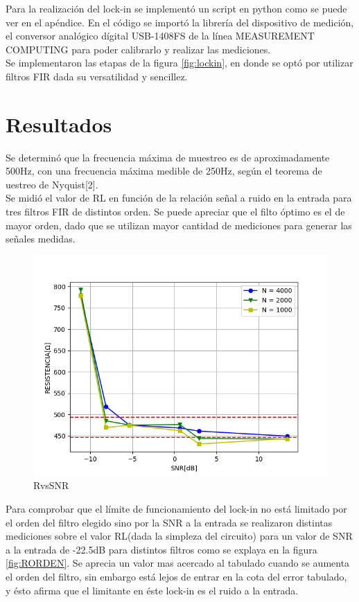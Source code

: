\documentclass[11pt,a4paper]{extarticle}
\begin{document}
\begin{multicols}{2}
Para la realización del lock-in se implementó un 
script en python como se puede ver en el apéndice.
En el código se importó la librería del dispositivo 
de medición, el 
conversor analógico dígital USB-1408FS de la línea 
MEASUREMENT COMPUTING para poder 
calibrarlo y realizar las mediciones.\\

Se implementaron 
las etapas de la figura \ref{fig:lockin}, en donde 
se optó por utilizar filtros FIR dada su versatilidad 
y sencillez.

\section{Resultados}

Se determinó que la frecuencia máxima de muestreo es 
de aproximadamente 
500Hz, con una frecuencia máxima medible de 250Hz, 
según el teorema de uestreo de Nyquist[2].\\

Se midió el valor de RL en función 
de la relación señal a ruido en la entrada para tres 
filtros FIR de distintos orden.
Se puede apreciar que el filto óptimo es el de mayor 
orden, dado que se utilizan mayor cantidad de 
mediciones para generar las señales medidas.

\begin{figure}[H]
	\centering
	\includegraphics[width=\linewidth]{Images/RvsSNR(segunda).png}
	\caption{RvsSNR}
	\label{fig:RvsSNR}
\end{figure}

Para comprobar que el límite de funcionamiento 
del lock-in no está limitado por el orden del 
filtro elegido sino por la SNR a la entrada
se realizaron distintas mediciones 
sobre el valor RL(dada la simpleza del circuito) 
para un valor de SNR a la entrada de -22.5dB para 
distintos filtros como se explaya en la figura 
\ref{fig:RORDEN}. Se aprecia un valor mas acercado 
al tabulado cuando se aumenta el orden del filtro, sin 
embargo está lejos de entrar en la cota del error 
tabulado, y ésto afirma que el limitante en éste 
lock-in es el ruido a la entrada.\\


\end{multicols}
\end{document}
